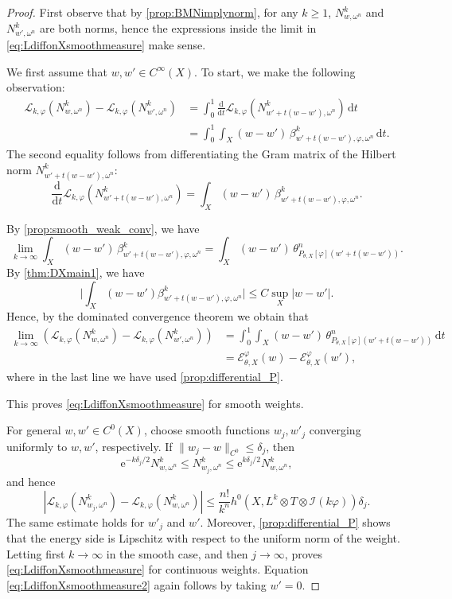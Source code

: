 \begin{proof}
First observe that by \cref{prop:BMNimplynorm}, for any $k\geq 1$, $N^k_{w,\omega^n}$ and $N^k_{w',\omega^n}$ are both norms, hence the expressions inside the limit in \eqref{eq:LdiffonXsmoothmeasure} make sense.

We first assume that $w,w'\in C^\infty(X)$. To start, we make the following observation:
\[
\begin{aligned}
\mathcal{L}_{k,\varphi}(N^k_{w,\omega^n}) - \mathcal{L}_{k,\varphi}(N^k_{w',\omega^n})&= \int_0^1 \frac{\mathrm{d}}{\mathrm{d}t} \mathcal{L}_{k,\varphi}(N^k_{w' + t(w-w'),\omega^n})\,\mathrm{d}t\\
& = \int_0^1 \int_X (w-w') \,\beta^k_{w' + t(w-w'),\varphi,\omega^n}\, \mathrm{d}t.
\end{aligned}
\]
The second equality follows from differentiating the Gram matrix of the Hilbert norm $N^k_{w'+t(w-w'),\omega^n}$:
\[
    \frac{\mathrm d}{\mathrm dt}\mathcal L_{k,\varphi}
    \left(N^k_{w'+t(w-w'),\omega^n}\right)=\int_X (w-w')\,\beta^k_{w'+t(w-w'),\varphi,\omega^n}.
\]

By \cref{prop:smooth_weak_conv}, we have
\[
\lim_{k\to\infty}\int_X (w-w') \,\beta^k_{w' + t(w-w'),\varphi,\omega^n}=\int_X (w-w')\,\theta_{P_{\theta,X}[\varphi](w' + t(w-w'))}^n.
\]
By \cref{thm:DXmain1}, we have
\[
\bigl|\int_X (w-w')\beta^k_{w' + t(w-w'),\varphi,\omega^n}\bigr| \leq C \sup_X |w - w'|.
\]
Hence, by the dominated convergence theorem we obtain that
\[
\begin{aligned}
\lim_{k\to\infty} \left(\mathcal{L}_{k,\varphi}(N^k_{w,\omega^n}) - \mathcal{L}_{k,\varphi}(N^k_{w',\omega^n})\right) &= \int_0^1 \int_X (w-w') \,\theta_{P_{\theta,X}[\varphi](w' + t(w-w'))}^n \,\mathrm{d}t\\
& = \mathcal{E}_{\theta,X}^{\varphi}(w)-\mathcal{E}_{\theta,X}^{\varphi}(w'),
\end{aligned}
\]
where in the last line we have used \cref{prop:differential_P}.

This proves \eqref{eq:LdiffonXsmoothmeasure} for smooth weights.

For general $w,w'\in C^0(X)$, choose smooth functions $w_j,w'_j$ converging uniformly to $w,w'$, respectively. If $\|w_j-w\|_{C^0}\leq \delta_j$, then
\[
\mathrm{e}^{-k\delta_j/2}N^k_{w,\omega^n}\leq N^k_{w_j,\omega^n}\leq \mathrm{e}^{k\delta_j/2}N^k_{w,\omega^n},
\]
and hence
\[
\left|\mathcal{L}_{k,\varphi}(N^k_{w_j,\omega^n})-\mathcal{L}_{k,\varphi}(N^k_{w,\omega^n})\right|
\leq \frac{n!}{k^n}h^0\left(X,L^k\otimes T\otimes \mathcal{I}(k\varphi)\right)\delta_j.
\]
The same estimate holds for $w'_j$ and $w'$. Moreover, \cref{prop:differential_P} shows that the energy side is Lipschitz with respect to the uniform norm of the weight. Letting first $k\to\infty$ in the smooth case, and then $j\to\infty$, proves \eqref{eq:LdiffonXsmoothmeasure} for continuous weights. Equation \eqref{eq:LdiffonXsmoothmeasure2} again follows by taking $w'=0$.
\end{proof}

